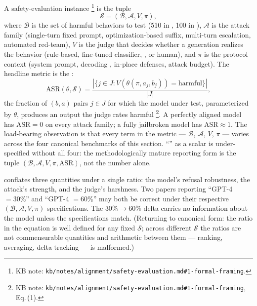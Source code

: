 A safety-evaluation instance%
\footnote{KB note: \texttt{kb/notes/alignment/safety-evaluation.md\#1-formal-framing}.}
is the tuple
\[
\mathcal{S} = (\mathcal{B}, \mathcal{A}, V, \pi),
\]
where $\mathcal{B}$ is the set of harmful behaviors to test (510 in
, 100 in ), $\mathcal{A}$ is the attack family
(single-turn fixed prompt, optimization-based suffix, multi-turn
escalation, automated red-team), $V$ is the judge that decides
whether a generation realizes the behavior (rule-based, fine-tuned
classifier, , or human), and $\pi$ is the protocol
context (system prompt, decoding , in-place defenses,
attack budget). The headline metric is the 
\citep[\S{}abstract]{chao2024-jailbreakbench}:
\[
\mathrm{ASR}(\theta, \mathcal{S}) =
\frac{|\{j \in J : V(\theta(\pi, a_j, b_j)) = \text{harmful}\}|}{|J|},
\]
the fraction of $(b, a)$ pairs $j \in J$ for which the model under
test, parameterized by $\theta$, produces an output the judge rates
harmful%
\footnote{KB note: \texttt{kb/notes/alignment/safety-evaluation.md\#1-formal-framing}, Eq.\,(1).}.
A perfectly aligned model has $\mathrm{ASR} = 0$ on every attack
family; a fully jailbroken model has $\mathrm{ASR} \approx 1$. The
load-bearing observation is that every term in the metric ---
$\mathcal{B}$, $\mathcal{A}$, $V$, $\pi$ --- varies across the four
canonical benchmarks of this section. ``'' as a scalar is
under-specified without all four: the methodologically mature
reporting form is the tuple $(\mathcal{B}, \mathcal{A}, V, \pi,
\mathrm{ASR})$, not the number alone.

\begin{intuition}
 conflates three quantities under a single ratio: the model's
refusal robustness, the attack's strength, and the judge's
harshness. Two papers reporting ``GPT-4  $= 30\%$'' and ``GPT-4
 $= 60\%$'' may both be correct under their respective
$(\mathcal{B}, \mathcal{A}, V, \pi)$ specifications. The $30\%
\to 60\%$ delta carries no information about the model unless the
specifications match. (Returning to canonical form: the ratio in
the  equation is well defined for any fixed $\mathcal{S}$;
across different $\mathcal{S}$ the ratios are not commensurable
quantities and arithmetic between them --- ranking, averaging,
delta-tracking --- is malformed.)
\end{intuition}


